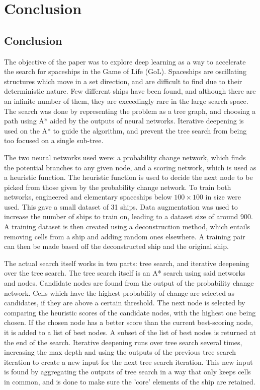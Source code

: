 \documentclass{l4proj}
\begin{document}

\chapter{Conclusion}    

\section{Conclusion}

The objective of the paper was to explore deep learning as a way to accelerate the search for spaceships in the Game of Life (GoL). Spaceships are oscillating structures which move in a set direction, and are difficult to find due to their deterministic nature. Few different ships have been found, and although there are an infinite number of them, they are exceedingly rare in the large search space. The search was done by representing the problem as a tree graph, and choosing a path using A* aided by the outputs of neural networks. Iterative deepening is used on the A* to guide the algorithm, and prevent the tree search from being too focused on a single sub-tree.

The two neural networks used were: a probability change network, which finds the potential branches to any given node, and a scoring network, which is used as a heuristic function. The heuristic function is used to decide the next node to be picked from those given by the probability change network. To train both networks, engineered and elementary spaceships below $100 \times 100$ in size were used. This gave a small dataset of 31 ships. Data augmentation was used to increase the number of ships to train on, leading to a dataset size of around 900. A training dataset is then created using a deconstruction method, which entails removing cells from a ship and adding random ones elsewhere. A training pair can then be made based off the deconstructed ship and the original ship.

The actual search itself works in two parts: tree search, and iterative deepening over the tree search. The tree search itself is an A* search using said networks and nodes. Candidate nodes are found from the output of the probability change network. Cells which have the highest probability of change are selected as candidates, if they are above a certain threshold. The next node is selected by comparing the heuristic scores of the candidate nodes, with the highest one being chosen. If the chosen node has a better score than the current best-scoring node, it is added to a list of best nodes. A subset of the list of best nodes is returned at the end of the search. Iterative deepening runs over tree search several times, increasing the max depth and using the outputs of the previous tree search iteration to create a new input for the next tree search iteration. This new input is found by aggregating the outputs of tree search in a way that only keeps cells in common, and is done to make sure the 'core' elements of the ship are retained.
\end{document}
